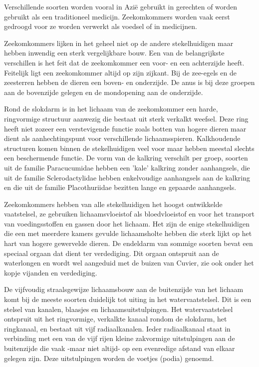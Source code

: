 Verschillende soorten worden vooral in Azië gebruikt in gerechten of worden gebruikt als een traditioneel medicijn.
Zeekomkommers worden vaak eerst gedroogd voor ze worden verwerkt als voedsel of in medicijnen.

Zeekomkommers lijken in het geheel niet op de andere stekelhuidigen maar hebben inwendig een sterk vergelijkbare bouw.
Een van de belangrijkste verschillen is het feit dat de zeekomkommer een voor- en een achterzijde heeft.
Feitelijk ligt een zeekomkommer altijd op zijn zijkant.
Bij de zee-egels en de zeesterren hebben de dieren een boven- en onderzijde.
De anus is bij deze groepen aan de bovenzijde gelegen en de mondopening aan de onderzijde.

Rond de slokdarm is in het lichaam van de zeekomkommer een harde, ringvormige structuur aanwezig die bestaat uit sterk verkalkt weefsel.
Deze ring heeft niet zozeer een verstevigende functie zoals botten van hogere dieren maar dient als aanhechtingspunt voor verschillende lichaamsspieren.
Kalkhoudende structuren komen binnen de stekelhuidigen veel voor maar hebben meestal slechts een beschermende functie.
De vorm van de kalkring verschilt per groep, soorten uit de familie Paracucumidae hebben een 'kale' kalkring zonder aanhangsels, die uit de familie Sclerodactylidae hebben enkelvoudige aanhangsels aan de kalkring en die uit de familie Placothuriidae bezitten lange en gepaarde aanhangsels.

Zeekomkommers hebben van alle stekelhuidigen het hoogst ontwikkelde vaatstelsel, ze gebruiken lichaamsvloeistof als bloedvloeistof en voor het transport van voedingsstoffen en gassen door het lichaam.
Het zijn de enige stekelhuidigen die een met meerdere kamers gevulde lichaamsholte hebben die sterk lijkt op het hart van hogere gewervelde dieren.
De endeldarm van sommige soorten bevat een speciaal orgaan dat dient ter verdediging.
Dit orgaan ontspruit aan de waterlongen en wordt wel aangeduid met de buizen van Cuvier, zie ook onder het kopje vijanden en verdediging.

De vijfvoudig straalsgewijze lichaamsbouw aan de buitenzijde van het lichaam komt bij de meeste soorten duidelijk tot uiting in het watervaatstelsel.
Dit is een stelsel van kanalen, blaasjes en lichaamsuitstulpingen.
Het watervaatstelsel ontspruit uit het ringvormige, verkalkte kanaal rondom de slokdarm, het ringkanaal, en bestaat uit vijf radiaalkanalen.
Ieder radiaalkanaal staat in verbinding met een van de vijf rijen kleine zakvormige uitstulpingen aan de buitenzijde die vaak -maar niet altijd- op een evenredige afstand van elkaar gelegen zijn.
Deze uitstulpingen worden de voetjes (podia) genoemd.


